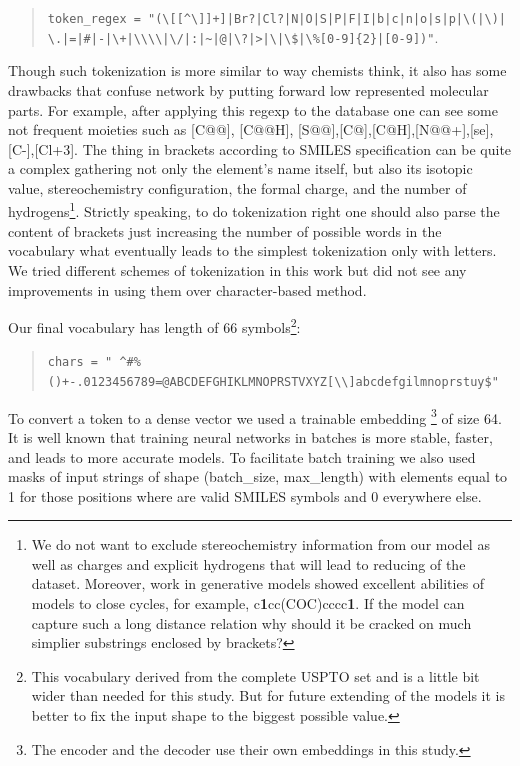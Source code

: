 \documentclass{article}
\begin{document}
\begin{quote}
\texttt{token\_regex = "(\textbackslash[[\textasciicircum \textbackslash]]+]|Br?|Cl?|N|O|S|P|F|I|b|c|n|o|s|p|\textbackslash(|\textbackslash)| \textbackslash.|=|\#|-|\textbackslash+|\textbackslash\textbackslash\textbackslash\textbackslash|\textbackslash/|:|\textasciitilde|@|\textbackslash?|>|\textbackslash*|\textbackslash\$|\textbackslash\%[0-9]\{2\}|[0-9])"}.
\end{quote}

Though such tokenization is more similar to way chemists think, it also has some drawbacks that confuse network by putting forward low represented molecular parts. For example, after applying this regexp to the database one can see some not frequent moieties such as [C@@], [C@@H], [S@@],[C@],[C@H],[N@@+],[se],[C-],[Cl+3]. The thing in brackets according to SMILES specification can be quite a complex gathering not only the element's name itself, but also its isotopic value, stereochemistry configuration, the formal charge, and the number of hydrogens\footnote{We do not want to exclude stereochemistry information from our model as well as charges and explicit hydrogens that will lead to reducing of the dataset. Moreover, work in generative models showed excellent abilities of models to close cycles, for example, c\textbf{1}cc(COC)cccc\textbf{1}. If the model can capture such a long distance relation why should it be cracked on much simplier substrings enclosed by brackets?}. Strictly speaking, to do tokenization right one should also parse the content of brackets just increasing the number of possible words in the vocabulary what eventually leads to the simplest tokenization only with letters. We tried different schemes of tokenization in this work but did not see any improvements in using them over character-based method.

Our final vocabulary has length of 66 symbols\footnote{This vocabulary derived from the complete USPTO set and is a little bit wider than needed for this study. But for future extending of the models it is better to fix the input shape to the biggest possible value.}:

\begin{quote}
\texttt{chars = " \textasciicircum\#\%()+-.\/0123456789=@ABCDEFGHIKLMNOPRSTVXYZ[\textbackslash\textbackslash]abcdefgilmnoprstuy\$"}
\end{quote}

To convert a token to a dense vector we used a trainable embedding
\footnote{The encoder and the decoder use their own embeddings in this study.} of size 64. 
It is well known that training neural networks in batches is more stable, faster, and leads to more accurate models. 
To facilitate batch training we also used masks of input strings of shape (batch\_size, max\_length) 
with elements equal to 1 for those positions where are valid SMILES symbols and 0 everywhere else. 
\end{document}
